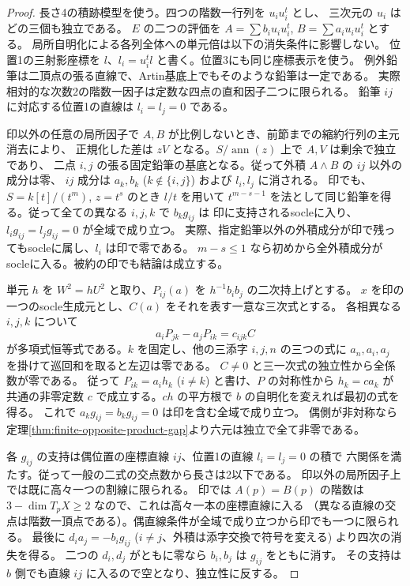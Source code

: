 \begin{proof}
長さ4の積跡模型を使う。四つの階数一行列を $u_i u_i^t$ とし、
三次元の $u_i$ はどの三個も独立である。
$E$ の二つの評価を $A=\sum b_i u_i u_i^t$, $B=\sum a_i u_i u_i^t$ とする。
局所自明化による各列全体への単元倍は以下の消失条件に影響しない。
位置1の三射影座標を $l$、$l_i=u_i^tl$ と書く。位置3にも同じ座標表示を使う。
例外鉛筆は二頂点の張る直線で、Artin基底上でもそのような鉛筆は一定である。
実際相対的な次数2の階数一因子は定数な四点の直和因子二つに限られる。
鉛筆 $ij$ に対応する位置1の直線は $l_i=l_j=0$ である。

印以外の任意の局所因子で $A,B$ が比例しないとき、前節までの縮約行列の主元消去により、
正規化した差は $z V$ となる。$S/\operatorname{ann}(z)$ 上で $A,V$ は剰余で独立であり、
二点 $i,j$ の張る固定鉛筆の基底となる。従って外積 $A\wedge B$ の $ij$ 以外の成分は零、
$ij$ 成分は $a_k,b_k$ ($k\notin\{i,j\}$) および $l_i,l_j$ に消される。
印でも、$S=k[t]/(t^m)$, $z=t^s$ のとき $l/t$ を用いて
$t^{m-s-1}$ を法として同じ鉛筆を得る。従って全ての異なる $i,j,k$ で $b_k g_{ij}$ は
印に支持されるsocleに入り、$l_i g_{ij}=l_j g_{ij}=0$ が全域で成り立つ。
実際、指定鉛筆以外の外積成分が印で残ってもsocleに属し、$l_i$ は印で零である。
$m-s\le1$ なら初めから全外積成分がsocleに入る。被約の印でも結論は成立する。

単元 $h$ を $W^2=h U^2$ と取り、$P_{ij}(a)$ を $h^{-1} b_i b_j$ の二次持上げとする。
$x$ を印の一つのsocle生成元とし、$C(a)$ をそれを表す一意な三次式とする。
各相異なる $i,j,k$ について
\[
 a_i P_{jk}-a_j P_{ik}=c_{ijk} C
\]
が多項式恒等式である。$k$ を固定し、他の三添字 $i,j,n$ の三つの式に
$a_n,a_i,a_j$ を掛けて巡回和を取ると左辺は零である。
$C\ne0$ と三一次式の独立性から全係数が零である。
従って $P_{ik}=a_i h_k$ ($i\ne k$) と書け、$P$ の対称性から $h_k=c a_k$ が
共通の非零定数 $c$ で成立する。$ch$ の平方根で $b$ の自明化を変えれば最初の式を得る。
これで $a_k g_{ij}=b_k g_{ij}=0$ は印を含む全域で成り立つ。
偶側が非対称なら定理\ref{thm:finite-opposite-product-gap}より六元は独立で全て非零である。

各 $g_{ij}$ の支持は偶位置の座標直線 $ij$、位置1の直線 $l_i=l_j=0$ の積で
六関係を満たす。従って一般の二式の交点数から長さは2以下である。
印以外の局所因子上では既に高々一つの割線に限られる。
印では $A(p)=B(p)$ の階数は $3-\dim T_pX\ge2$ なので、これは高々一本の座標直線に入る
（異なる直線の交点は階数一頂点である）。偶直線条件が全域で成り立つから印でも一つに限られる。
最後に $d_i a_j=-b_i g_{ij}$ ($i\ne j$、外積は添字交換で符号を変える) より四次の消失を得る。
二つの $d_i,d_j$ がともに零なら $b_i,b_j$ は $g_{ij}$ をともに消す。
その支持は $b$ 側でも直線 $ij$ に入るので空となり、独立性に反する。
\end{proof}
